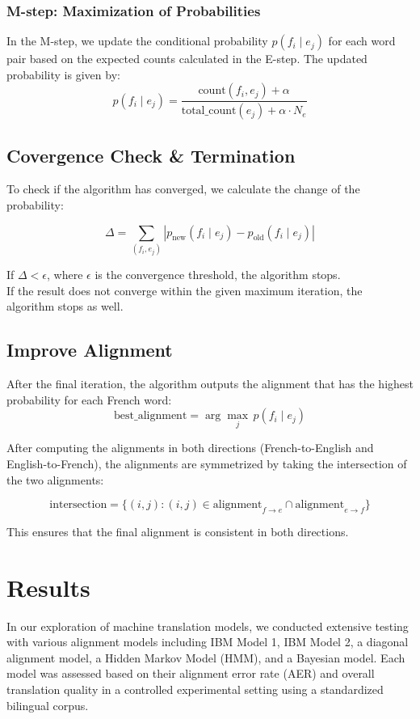 \documentclass{article}
\begin{document}
\subsubsection{M-step: Maximization of Probabilities}
In the M-step, we update the conditional probability \( p(f_i \mid e_j) \) for each word pair based on the expected counts calculated in the E-step. The updated probability is given by:
\[
p(f_i \mid e_j) = \frac{\text{count}(f_i, e_j) + \alpha}{\text{total\_count}(e_j) + \alpha \cdot N_e}
\]

\subsection{Covergence Check \& Termination}
To check if the algorithm has converged, we calculate the change of the probability:

\[
\Delta = \sum_{(f_i, e_j)} \left| p_{\text{new}}(f_i \mid e_j) - p_{\text{old}}(f_i \mid e_j) \right|
\]

If \( \Delta < \epsilon \), where \( \epsilon \) is the convergence threshold, the algorithm stops.\\[10pt]
If the result does not converge within the given maximum iteration, the algorithm stops as well.

\subsection{Improve Alignment}
After the final iteration, the algorithm outputs the alignment that has the highest probability for each French word:
\[
\text{best\_alignment} = \arg\max_j \, p(f_i \mid e_j)
\]

After computing the alignments in both directions (French-to-English and English-to-French), the alignments are symmetrized by taking the intersection of the two alignments:

\[
\text{intersection} = \{ (i, j) : (i, j) \in \text{alignment}_{f \to e} \cap \text{alignment}_{e \to f} \}
\]

This ensures that the final alignment is consistent in both directions.



\section{Results}
In our exploration of machine translation models, we conducted extensive testing with various alignment models including IBM Model 1, IBM Model 2, a diagonal alignment model, a Hidden Markov Model (HMM), and a Bayesian model. Each model was assessed based on their alignment error rate (AER) and overall translation quality in a controlled experimental setting using a standardized bilingual corpus.\\
\end{document}
